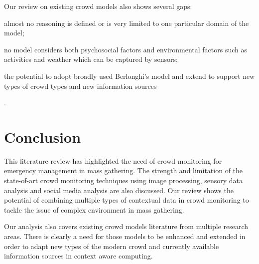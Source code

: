 Our review on existing crowd models also shows several gaps:
\begin{inparaenum}[i)]
	\item almost no reasoning is defined or is very limited to one particular domain of the model;
	\item no model considers both psychosocial factors and environmental factors such as activities and weather which can be captured by sensors;
	\item the potential to adopt broadly used Berlonghi’s model and extend to support new types of crowd types and new information sources
\end{inparaenum}.

\section{Conclusion}
This literature review has highlighted the need of crowd monitoring for emergency management in mass gathering. The strength and limitation of the state-of-art crowd monitoring techniques using image processing, sensory data analysis and social media analysis are also discussed. Our review shows the potential of combining multiple types of contextual data in crowd monitoring to tackle the issue of complex environment in mass gathering.

Our analysis also covers existing crowd models literature from multiple research areas. There is clearly a need for those models to be enhanced and extended in order to adapt new types of the modern crowd and currently available information sources in context aware computing.